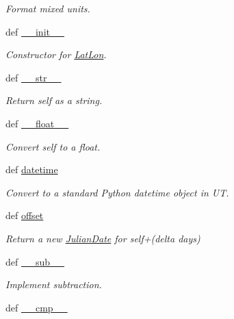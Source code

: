 \begin{DoxyCompactItemize}
\begin{DoxyCompactList}\small\item\em Format mixed units. \end{DoxyCompactList}\item 
def \hyperlink{namespaceamonpy_1_1sim_1_1sidereal_a0d12fc226bca67ce88441c23999a0985}{\-\_\-\-\_\-init\-\_\-\-\_\-}
\begin{DoxyCompactList}\small\item\em Constructor for \hyperlink{classamonpy_1_1sim_1_1sidereal_1_1_lat_lon}{Lat\-Lon}. \end{DoxyCompactList}\item 
def \hyperlink{namespaceamonpy_1_1sim_1_1sidereal_a642ffbfb2acc4e115b5b484c6c2d9cef}{\-\_\-\-\_\-str\-\_\-\-\_\-}
\begin{DoxyCompactList}\small\item\em Return self as a string. \end{DoxyCompactList}\item 
def \hyperlink{namespaceamonpy_1_1sim_1_1sidereal_a19698bae1422cc6262bcd71eec8aeb6a}{\-\_\-\-\_\-float\-\_\-\-\_\-}
\begin{DoxyCompactList}\small\item\em Convert self to a float. \end{DoxyCompactList}\item 
def \hyperlink{namespaceamonpy_1_1sim_1_1sidereal_a1cc24596a65c223ed73b0919fe5b87d6}{datetime}
\begin{DoxyCompactList}\small\item\em Convert to a standard Python datetime object in U\-T. \end{DoxyCompactList}\item 
def \hyperlink{namespaceamonpy_1_1sim_1_1sidereal_a45f7a30958b923a8e0dd1bd4172633d2}{offset}
\begin{DoxyCompactList}\small\item\em Return a new \hyperlink{classamonpy_1_1sim_1_1sidereal_1_1_julian_date}{Julian\-Date} for self+(delta days) \end{DoxyCompactList}\item 
def \hyperlink{namespaceamonpy_1_1sim_1_1sidereal_ad2b5f4f7b84e506b5fa3c2bc55a35c58}{\-\_\-\-\_\-sub\-\_\-\-\_\-}
\begin{DoxyCompactList}\small\item\em Implement subtraction. \end{DoxyCompactList}\item 
def \hyperlink{namespaceamonpy_1_1sim_1_1sidereal_a06ad8ed4711bbc5269214c99af3d33bf}{\-\_\-\-\_\-cmp\-\_\-\-\_\-}

\end{DoxyCompactItemize}
